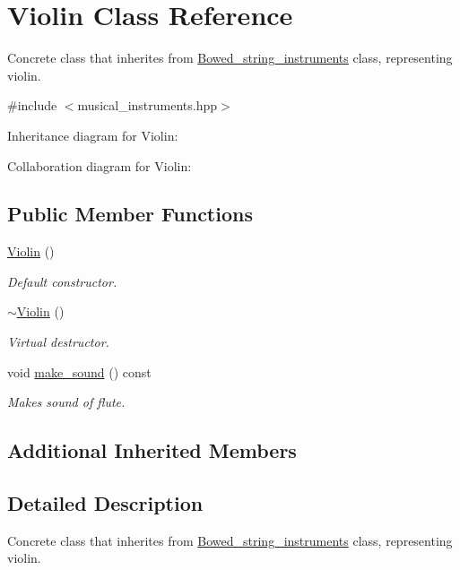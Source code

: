 \hypertarget{classViolin}{}\section{Violin Class Reference}
\label{classViolin}


Concrete class that inherites from \hyperlink{classBowed__string__instruments}{Bowed\+\_\+string\+\_\+instruments} class, representing violin.  




{\ttfamily \#include $<$musical\+\_\+instruments.\+hpp$>$}



Inheritance diagram for Violin\+:


Collaboration diagram for Violin\+:
\subsection*{Public Member Functions}
\begin{DoxyCompactItemize}
\item 
\hyperlink{classViolin_aada72f25d6545663bf5d5020254fe480}{Violin} ()
\begin{DoxyCompactList}\small\item\em Default constructor. \end{DoxyCompactList}\item 
\hyperlink{classViolin_a51d0d7194d4eeb93842318fd8c4dbb3c}{$\sim$\+Violin} ()
\begin{DoxyCompactList}\small\item\em Virtual destructor. \end{DoxyCompactList}\item 
void \hyperlink{classViolin_ab298ccb12bc63033860b614f9d8f3ec8}{make\+\_\+sound} () const 
\begin{DoxyCompactList}\small\item\em Makes sound of flute. \end{DoxyCompactList}\end{DoxyCompactItemize}
\subsection*{Additional Inherited Members}


\subsection{Detailed Description}
Concrete class that inherites from \hyperlink{classBowed__string__instruments}{Bowed\+\_\+string\+\_\+instruments} class, representing violin. 

